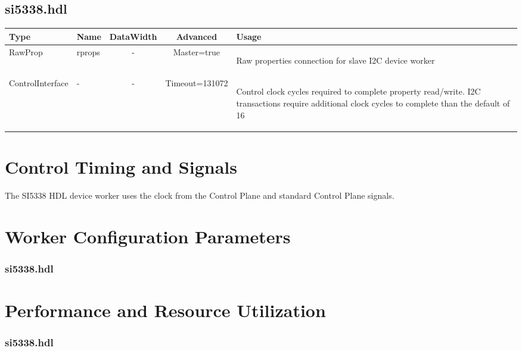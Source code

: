 \documentclass{article}
\def\comp{si5338}
\edef\ecomp{si5338}
\def\Comp{SI5338}
\begin{document}
\begin{landscape}
	\subsection*{\comp.hdl}
	\begin{scriptsize}
		\begin{tabular}{|M{2cm}|M{1.5cm}|c|c|M{12cm}|}
			\hline
			Type & Name & DataWidth & Advanced & Usage \\
			\hline
			RawProp
			& rprops
			& -
			& Master=true
			& \begin{flushleft}Raw properties connection for slave I2C device worker\end{flushleft}\\
			\hline
			ControlInterface
			& -
			& -
			& Timeout=131072
			& \begin{flushleft}Control clock cycles required to complete property  read/write. I2C transactions require additional clock cycles to complete than the default of 16 \end{flushleft}\\
			\hline
		\end{tabular}
	\end{scriptsize}
\end{landscape}

\section*{Control Timing and Signals}
The \Comp{} HDL device worker uses the clock from the Control Plane and standard Control Plane signals.

\begin{landscape}
\section*{Worker Configuration Parameters}
\subsubsection*{\comp.hdl}

\section*{Performance and Resource Utilization}
\subsubsection*{\comp.hdl}

\end{landscape}
\end{document}
